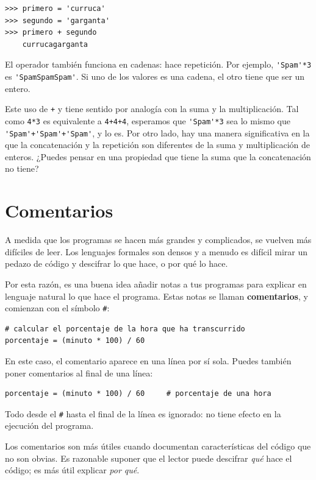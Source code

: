 \documentclass[10pt]{book}
\begin{document}
\begin{verbatim}
>>> primero = 'curruca'
>>> segundo = 'garganta'
>>> primero + segundo
    currucagarganta
\end{verbatim}
%
El operador {\tt *} también funciona en cadenas: hace repetición.
Por ejemplo, \verb"'Spam'*3" es \verb"'SpamSpamSpam'".  Si uno de los
valores es una cadena, el otro tiene que ser un entero.

Este uso de {\tt +} y {\tt *} tiene sentido por
analogía con la suma y la multiplicación.  Tal como {\tt 4*3} es
equivalente a {\tt 4+4+4}, esperamos que \verb"'Spam'*3" sea lo mismo que
\verb"'Spam'+'Spam'+'Spam'", y lo es.  Por otro lado, hay una
manera significativa en la que la concatenación y la repetición son
diferentes de la suma y multiplicación de enteros.
¿Puedes pensar en una propiedad que tiene la suma
que la concatenación no tiene?


\section{Comentarios}

A medida que los programas se hacen más grandes y complicados, se vuelven más difíciles
de leer.  Los lenguajes formales son densos y a menudo es difícil
mirar un pedazo de código y descifrar lo que hace, o por qué lo hace.

Por esta razón, es una buena idea añadir notas a tus programas para explicar
en lenguaje natural lo que hace el programa.  Estas notas se llaman
{\bf comentarios}, y comienzan con el símbolo \verb"#":

\begin{verbatim}
# calcular el porcentaje de la hora que ha transcurrido
porcentaje = (minuto * 100) / 60
\end{verbatim}
%
En este caso, el comentario aparece en una línea por sí sola.  Puedes también poner
comentarios al final de una línea:

\begin{verbatim}
porcentaje = (minuto * 100) / 60     # porcentaje de una hora
\end{verbatim}
%
Todo desde el {\tt \#} hasta el final de la línea es ignorado: no
tiene efecto en la ejecución del programa.

Los comentarios son más útiles cuando documentan características del
código que no son obvias.  Es razonable suponer que el lector puede descifrar
{\em qué} hace el código; es más útil explicar {\em por qué}.
\end{document}
